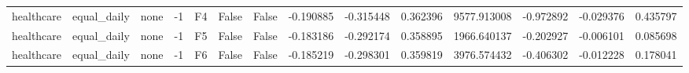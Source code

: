 \begin{tabular}{lllrlllrrrrrrr}
healthcare &    equal\_daily &      none &    -1 &  F4 &           False &            False & -0.190885 & -0.315448 & 0.362396 &      9577.913008 &          -0.972892 &       -0.029376 &            0.435797 \\
healthcare &    equal\_daily &      none &    -1 &  F5 &           False &            False & -0.183186 & -0.292174 & 0.358895 &      1966.640137 &          -0.202927 &       -0.006101 &            0.085698 \\
healthcare &    equal\_daily &      none &    -1 &  F6 &           False &            False & -0.185219 & -0.298301 & 0.359819 &      3976.574432 &          -0.406302 &       -0.012228 &            0.178041 \\
\bottomrule
\end{tabular}
